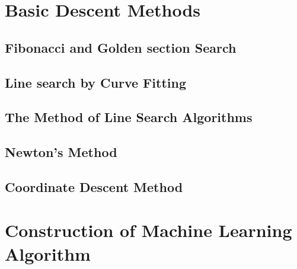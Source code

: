 \section{Basic Descent Methods}
\subsection{Fibonacci and Golden section Search}
\subsection{Line search by Curve Fitting}
\subsection{The Method of Line Search Algorithms}
\subsection{Newton's Method}
\subsection{Coordinate Descent Method}


\section{Construction of Machine Learning Algorithm}




















